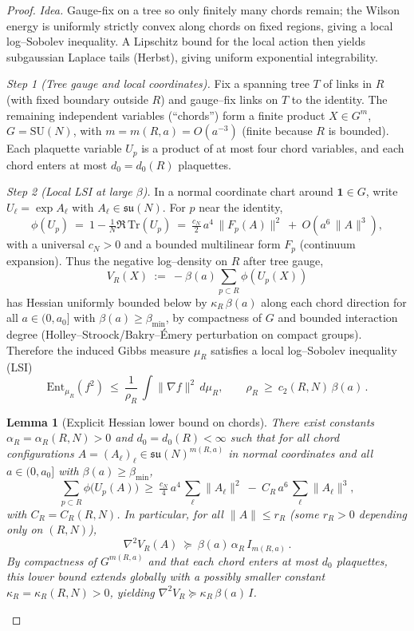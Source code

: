 \documentclass[11pt]{amsart}
\theoremstyle{plain}
\newtheorem{lemma}[theorem]{Lemma}
\theoremstyle{definition}
\theoremstyle{remark}
\begin{document}
\begin{proof}
\emph{Idea.} Gauge-fix on a tree so only finitely many chords remain; the Wilson energy is uniformly strictly convex along chords on fixed regions, giving a local log–Sobolev inequality. A Lipschitz bound for the local action then yields subgaussian Laplace tails (Herbst), giving uniform exponential integrability.

\medskip
\emph{Step 1 (Tree gauge and local coordinates).} Fix a spanning tree $T$ of links in $R$ (with fixed boundary outside $R$) and gauge--fix links on $T$ to the identity. The remaining independent variables (``chords'') form a finite product $X\in G^{m}$, $G=\mathrm{SU}(N)$, with $m=m(R,a)=O(a^{-3})$ (finite because $R$ is bounded). Each plaquette variable $U_p$ is a product of at most four chord variables, and each chord enters at most $d_0=d_0(R)$ plaquettes.

\emph{Step 2 (Local LSI at large $\beta$).} In a normal coordinate chart around $\mathbf{1}\in G$, write $U_\ell=\exp A_\ell$ with $A_\ell\in\mathfrak{su}(N)$. For $p$ near the identity,
\[
  \phi(U_p)\ =\ 1-\tfrac{1}{N}\Re\,\mathrm{Tr}(U_p)
  \ =\ \tfrac{c_N}{2}\,a^4\,\|F_p(A)\|^2\ +\ O(a^6\,\|A\|^3),
\]
with a universal $c_N>0$ and a bounded multilinear form $F_p$ (continuum expansion). Thus the negative log--density on $R$ after tree gauge,
\[
  V_R(X)\ :=\ -\beta(a)\sum_{p\subset R}\phi(U_p(X))
\]
has Hessian uniformly bounded below by $\kappa_R\,\beta(a)$ along each chord direction for all $a\in(0,a_0]$ with $\beta(a)\ge \beta_{\min}$, by compactness of $G$ and bounded interaction degree (Holley--Stroock/Bakry--\'Emery perturbation on compact groups). Therefore the induced Gibbs measure $\mu_R$ satisfies a local log--Sobolev inequality (LSI)
\[
  \mathrm{Ent}_{\mu_R}(f^2)\ \le\ \frac{1}{\rho_R}\,\int \|\nabla f\|^2\,d\mu_R,
  \qquad \rho_R\ \ge\ c_2(R,N)\,\beta(a)\,.
\]
\begin{lemma}[Explicit Hessian lower bound on chords]\label{lem:hessian-lower-chords}
There exist constants $\alpha_R=\alpha_R(R,N)>0$ and $d_0=d_0(R)<\infty$ such that for all chord configurations $A=(A_\ell)_\ell\in\mathfrak{su}(N)^{m(R,a)}$ in normal coordinates and all $a\in(0,a_0]$ with $\beta(a)\ge\beta_{\min}$,
\[
  \sum_{p\subset R} \phi\big(U_p(A)\big)\ \ge\ \tfrac{c_N}{4}\,a^4\,\sum_{\ell}\|A_\ell\|^2\ -\ C_R\,a^6\,\sum_{\ell}\|A_\ell\|^3,
\]
with $C_R=C_R(R,N)$. In particular, for all $\|A\|\le r_R$ (some $r_R>0$ depending only on $(R,N)$),
\[
  \nabla^2 V_R(A)\ \succeq\ \beta(a)\,\alpha_R\, I_{m(R,a)}\,.
\]
By compactness of $G^{m(R,a)}$ and that each chord enters at most $d_0$ plaquettes, this lower bound extends globally with a possibly smaller constant $\kappa_R=\kappa_R(R,N)>0$, yielding $\nabla^2 V_R\succeq \kappa_R\,\beta(a)\,I$.
\end{lemma}


\end{proof}
\end{document}
